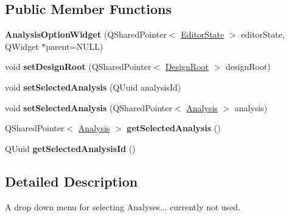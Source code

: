 \subsection*{Public Member Functions}
\begin{DoxyCompactItemize}
\item 
\hypertarget{class_picto_1_1_analysis_option_widget_a46e8a55624a83ca7ce4459fb37dfcc98}{{\bfseries Analysis\-Option\-Widget} (Q\-Shared\-Pointer$<$ \hyperlink{class_editor_state}{Editor\-State} $>$ editor\-State, Q\-Widget $\ast$parent=N\-U\-L\-L)}\label{class_picto_1_1_analysis_option_widget_a46e8a55624a83ca7ce4459fb37dfcc98}

\item 
\hypertarget{class_picto_1_1_analysis_option_widget_ae5d8dab3a79f9e062622ad1c013d1101}{void {\bfseries set\-Design\-Root} (Q\-Shared\-Pointer$<$ \hyperlink{class_picto_1_1_design_root}{Design\-Root} $>$ design\-Root)}\label{class_picto_1_1_analysis_option_widget_ae5d8dab3a79f9e062622ad1c013d1101}

\item 
\hypertarget{class_picto_1_1_analysis_option_widget_a179414a058b6659e4b981fdce0fc6501}{void {\bfseries set\-Selected\-Analysis} (Q\-Uuid analysis\-Id)}\label{class_picto_1_1_analysis_option_widget_a179414a058b6659e4b981fdce0fc6501}

\item 
\hypertarget{class_picto_1_1_analysis_option_widget_a0538eff8390b943b3d50acd69039089f}{void {\bfseries set\-Selected\-Analysis} (Q\-Shared\-Pointer$<$ \hyperlink{class_picto_1_1_analysis}{Analysis} $>$ analysis)}\label{class_picto_1_1_analysis_option_widget_a0538eff8390b943b3d50acd69039089f}

\item 
\hypertarget{class_picto_1_1_analysis_option_widget_a01163da9c32a0c85b43cb82b3ec2ec67}{Q\-Shared\-Pointer$<$ \hyperlink{class_picto_1_1_analysis}{Analysis} $>$ {\bfseries get\-Selected\-Analysis} ()}\label{class_picto_1_1_analysis_option_widget_a01163da9c32a0c85b43cb82b3ec2ec67}

\item 
\hypertarget{class_picto_1_1_analysis_option_widget_ac0929ebde3eaabecfea3a2e7d06d46ea}{Q\-Uuid {\bfseries get\-Selected\-Analysis\-Id} ()}\label{class_picto_1_1_analysis_option_widget_ac0929ebde3eaabecfea3a2e7d06d46ea}

\end{DoxyCompactItemize}


\subsection{Detailed Description}
A drop down menu for selecting Analyses... currently not used. 

